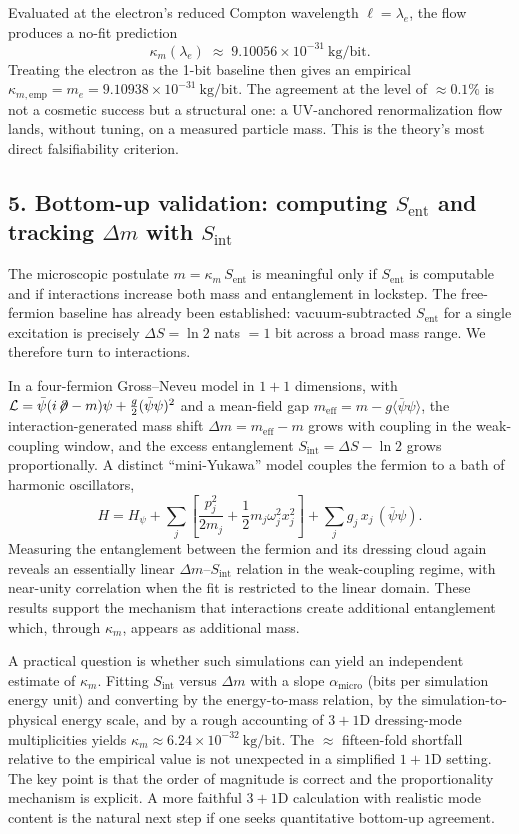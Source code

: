 \documentclass[11pt]{article}
\begin{document}
Evaluated at the electron’s reduced Compton wavelength $\ell = \lambda_e$, the flow produces a no-fit prediction
\[
\kappa_m(\lambda_e) \;\approx\; 9.10056 \times 10^{-31}\ \mathrm{kg/bit}.
\]
Treating the electron as the 1-bit baseline then gives an empirical $\kappa_{m,\mathrm{emp}} = m_e = 9.10938 \times 10^{-31}\ \mathrm{kg/bit}$. The agreement at the level of $\approx 0.1\%$ is not a cosmetic success but a structural one: a UV-anchored renormalization flow lands, without tuning, on a measured particle mass. This is the theory’s most direct falsifiability criterion.

\subsection*{5. Bottom-up validation: computing $S_{\mathrm{ent}}$ and tracking $\Delta m$ with $S_{\mathrm{int}}$}

The microscopic postulate $m = \kappa_m\, S_{\mathrm{ent}}$ is meaningful only if $S_{\mathrm{ent}}$ is computable and if interactions increase both mass and entanglement in lockstep. The free-fermion baseline has already been established: vacuum-subtracted $S_{\mathrm{ent}}$ for a single excitation is precisely $\Delta S = \ln 2$ nats $= 1$ bit across a broad mass range. We therefore turn to interactions.

In a four-fermion Gross–Neveu model in $1{+}1$ dimensions, with $\mathcal{L} = \bar\psi (i\!\not\!\partial - m) \psi + \frac{g}{2} (\bar\psi \psi)^2$ and a mean-field gap $m_{\mathrm{eff}} = m - g \langle\bar\psi \psi\rangle$, the interaction-generated mass shift $\Delta m = m_{\mathrm{eff}} - m$ grows with coupling in the weak-coupling window, and the excess entanglement $S_{\mathrm{int}} = \Delta S - \ln 2$ grows proportionally. A distinct “mini-Yukawa” model couples the fermion to a bath of harmonic oscillators,
\[
H = H_\psi + \sum_j \left[ \frac{p_j^2}{2 m_j} + \frac{1}{2} m_j \omega_j^2 x_j^2 \right] + \sum_j g_j\, x_j\, (\bar\psi \psi).
\]
Measuring the entanglement between the fermion and its dressing cloud again reveals an essentially linear $\Delta m$–$S_{\mathrm{int}}$ relation in the weak-coupling regime, with near-unity correlation when the fit is restricted to the linear domain. These results support the mechanism that interactions create additional entanglement which, through $\kappa_m$, appears as additional mass.

A practical question is whether such simulations can yield an independent estimate of $\kappa_m$. Fitting $S_{\mathrm{int}}$ versus $\Delta m$ with a slope $\alpha_{\mathrm{micro}}$ (bits per simulation energy unit) and converting by the energy-to-mass relation, by the simulation-to-physical energy scale, and by a rough accounting of $3{+}1$D dressing-mode multiplicities yields $\kappa_m \approx 6.24 \times 10^{-32}\ \mathrm{kg/bit}$. The $\approx$ fifteen-fold shortfall relative to the empirical value is not unexpected in a simplified $1{+}1$D setting. The key point is that the order of magnitude is correct and the proportionality mechanism is explicit. A more faithful $3{+}1$D calculation with realistic mode content is the natural next step if one seeks quantitative bottom-up agreement.
\end{document}
